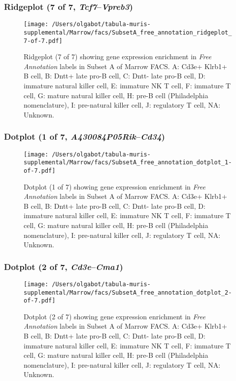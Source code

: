 \clearpage

\subsubsection{Ridgeplot (7 of 7, \emph{Tcf7}--\emph{Vpreb3})}
\begin{figure}[h]
\centering
\texttt{[image: /Users/olgabot/tabula-muris-supplemental/Marrow/facs/SubsetA\_free\_annotation\_ridgeplot\_7-of-7.pdf]}

\caption{ Ridgeplot (7 of 7)  showing gene expression enrichment in \emph{Free Annotation} labels in Subset A of Marrow FACS. A: Cd3e+ Klrb1+ B cell, B: Dntt+ late pro-B cell, C: Dntt- late pro-B cell, D: immature natural killer cell, E: immature NK T cell, F: immature T cell, G: mature natural killer cell, H: pre-B cell (Philadelphia nomenclature), I: pre-natural killer cell, J: regulatory T cell, NA: Unknown.}
\end{figure}


\clearpage

\subsubsection{Dotplot (1 of 7, \emph{A430084P05Rik}--\emph{Cd34})}
\begin{figure}[h]
\centering
\texttt{[image: /Users/olgabot/tabula-muris-supplemental/Marrow/facs/SubsetA\_free\_annotation\_dotplot\_1-of-7.pdf]}

\caption{ Dotplot (1 of 7)  showing gene expression enrichment in \emph{Free Annotation} labels in Subset A of Marrow FACS. A: Cd3e+ Klrb1+ B cell, B: Dntt+ late pro-B cell, C: Dntt- late pro-B cell, D: immature natural killer cell, E: immature NK T cell, F: immature T cell, G: mature natural killer cell, H: pre-B cell (Philadelphia nomenclature), I: pre-natural killer cell, J: regulatory T cell, NA: Unknown.}
\end{figure}


\clearpage

\subsubsection{Dotplot (2 of 7, \emph{Cd3e}--\emph{Cma1})}
\begin{figure}[h]
\centering
\texttt{[image: /Users/olgabot/tabula-muris-supplemental/Marrow/facs/SubsetA\_free\_annotation\_dotplot\_2-of-7.pdf]}

\caption{ Dotplot (2 of 7)  showing gene expression enrichment in \emph{Free Annotation} labels in Subset A of Marrow FACS. A: Cd3e+ Klrb1+ B cell, B: Dntt+ late pro-B cell, C: Dntt- late pro-B cell, D: immature natural killer cell, E: immature NK T cell, F: immature T cell, G: mature natural killer cell, H: pre-B cell (Philadelphia nomenclature), I: pre-natural killer cell, J: regulatory T cell, NA: Unknown.}
\end{figure}



